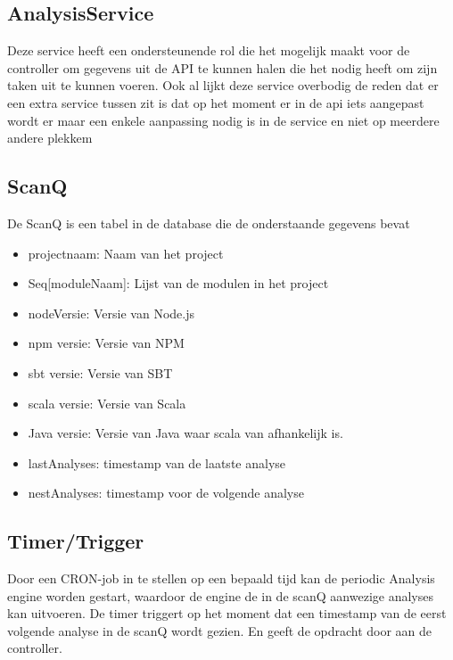 \subsection{AnalysisService}\label{subsec:analysisservice}
Deze service heeft een ondersteunende rol die het mogelijk maakt voor de controller om gegevens uit de API te kunnen halen die het nodig heeft om  zijn taken uit te kunnen voeren. Ook al lijkt deze service overbodig de reden dat er een extra service tussen zit is dat op het moment er in de api iets aangepast wordt er maar een enkele aanpassing nodig is in de service en niet op meerdere andere plekkem

\subsection{ScanQ}\label{subsec:scanq}
De ScanQ is een tabel in de database die de onderstaande gegevens bevat
\begin{itemize}
    \item projectnaam: Naam van het project
    \item Seq[moduleNaam]: Lijst van de modulen in het project
    \item nodeVersie:  Versie van Node.js
    \item npm versie: Versie van NPM
    \item sbt versie: Versie van SBT
    \item scala versie: Versie van Scala
    \item Java versie: Versie van Java waar scala van afhankelijk is.
    \item lastAnalyses: timestamp van de laatste analyse
    \item nestAnalyses: timestamp voor de volgende analyse
\end{itemize}


\subsection{Timer/Trigger}
Door een CRON-job in te stellen op een bepaald tijd kan de periodic Analysis engine worden gestart, waardoor de engine de in de scanQ aanwezige analyses kan uitvoeren.
De timer triggert op het moment dat een timestamp van de eerst volgende analyse in de scanQ wordt gezien. En geeft de opdracht door aan de controller.
